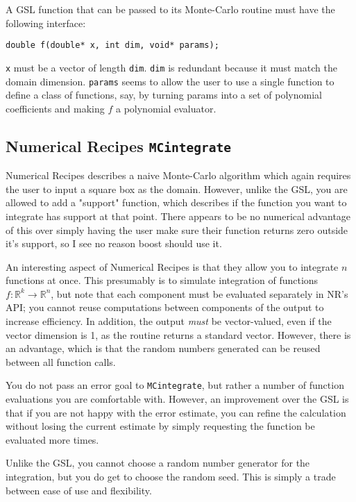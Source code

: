 \documentclass[landscape]{article}
\numberwithin{equation}{section}
\begin{document}
A GSL function that can be passed to its Monte-Carlo routine must have the following interface:
\begin{verbatim}
double f(double* x, int dim, void* params);
\end{verbatim}
\texttt{x} must be a vector of length \texttt{dim}.
\texttt{dim} is redundant because it must match the domain dimension.
\texttt{params} seems to allow the user to use a single function to define a class of functions, say, by turning params into a set of polynomial coefficients and making $f$ a polynomial evaluator.

\subsection{Numerical Recipes \texttt{MCintegrate}}

Numerical Recipes describes a naive Monte-Carlo algorithm which again requires the user to input a square box as the domain.
However, unlike the GSL, you are allowed to add a "support" function, which describes if the function you want to integrate has support at that point.
There appears to be no numerical advantage of this over simply having the user make sure their function returns zero outside it's support, so I see no reason boost should use it.

An interesting aspect of Numerical Recipes is that they allow you to integrate $n$ functions at once.
This presumably is to simulate integration of functions $f\colon \mathbb{R}^{k} \to \mathbb{R}^{n}$, but note that each component must be evaluated separately in NR's API; you cannot reuse computations between components of the output to increase efficiency.
In addition, the output \emph{must} be vector-valued, even if the vector dimension is 1, as the routine returns a standard vector.
However, there is an advantage, which is that the random numbers generated can be reused between all function calls.

You do not pass an error goal to \texttt{MCintegrate}, but rather a number of function evaluations you are comfortable with.
However, an improvement over the GSL is that if you are not happy with the error estimate, you can refine the calculation without losing the current estimate by simply requesting the function be evaluated more times.

Unlike the GSL, you cannot choose a random number generator for the integration, but you do get to choose the random seed.
This is simply a trade between ease of use and flexibility.
\end{document}
